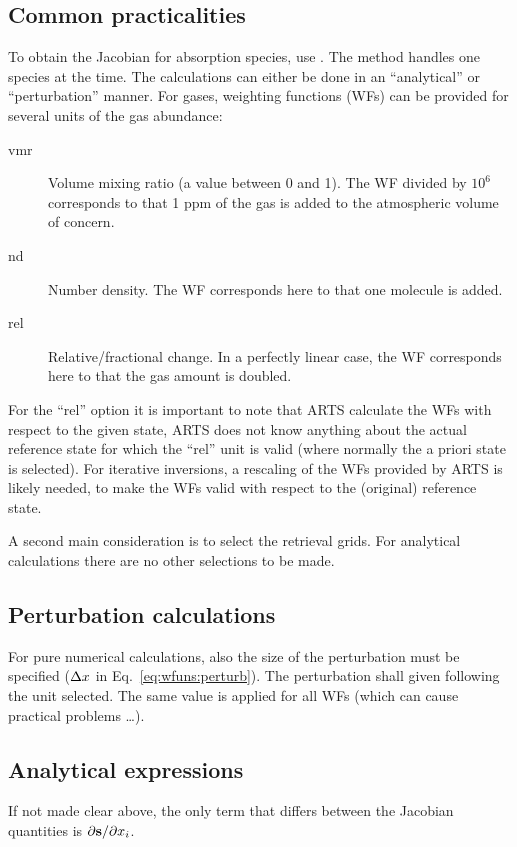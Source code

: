 \subsection{Common practicalities}
%
To obtain the Jacobian for absorption species, use
. The method handles one species at the time.
The calculations can either be done in an ``analytical'' or ``perturbation''
manner. For gases, weighting functions (WFs) can be provided for several units
of the gas abundance:
\begin{description}
\item[vmr] Volume mixing ratio (a value between 0 and 1). The WF divided by
  $10^6$ corresponds to that 1 ppm of the gas is added to the atmospheric
  volume of concern.
\item[nd] Number density. The WF corresponds here to that one molecule is added.
\item[rel] Relative/fractional change. In a perfectly linear case, the WF
  corresponds here to that the gas amount is doubled.
\end{description}
For the ``rel'' option it is important to note that ARTS
calculate the WFs with respect to the given state, ARTS does not know anything
about the actual reference state for which the ``rel'' unit is valid (where
normally the a priori state is selected). For iterative inversions, a rescaling
of the WFs provided by ARTS is likely needed, to make the WFs valid with
respect to the (original) reference state. 

A second main consideration is to select the retrieval grids. For analytical
calculations there are no other selections to be made. 


\subsection{Perturbation calculations}
%
For pure numerical calculations, also the size of the perturbation must be
specified ($\Delta x$ in Eq.~\ref{eq:wfuns:perturb}). The perturbation
shall given following the unit selected. The same value is applied for all WFs
(which can cause practical problems \dots).


\subsection{Analytical expressions}
%
If not made clear above, the only term that differs between the Jacobian
quantities is $\partial{\bf s}/\partial x_{i}$.


